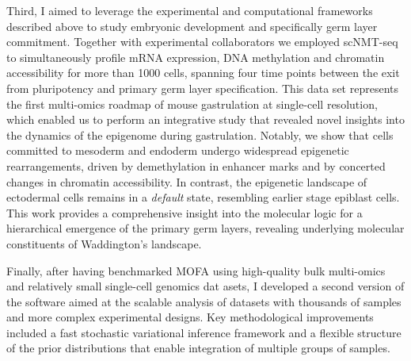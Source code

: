 Third, I aimed to leverage the experimental and computational frameworks described above to study embryonic development and specifically germ layer commitment. Together with experimental collaborators we employed scNMT-seq to simultaneously profile mRNA expression, DNA methylation and chromatin accessibility for more than 1000 cells, spanning four time points between the exit from pluripotency and primary germ layer specification. This data set represents the first multi-omics roadmap of mouse gastrulation at single-cell resolution, which enabled us to perform an integrative study that revealed novel insights into the dynamics of the epigenome during gastrulation. Notably, we show that cells committed to mesoderm and endoderm undergo widespread epigenetic rearrangements, driven by demethylation in enhancer marks and by concerted changes in chromatin accessibility. In contrast, the epigenetic landscape of ectodermal cells remains in a \textit{default} state, resembling earlier stage epiblast cells. This work provides a comprehensive insight into the molecular logic for a hierarchical emergence of the primary germ layers, revealing underlying molecular constituents of Waddington's landscape.

Finally, after having benchmarked MOFA using high-quality bulk multi-omics and relatively small single-cell genomics dat asets, I developed a second version of the software aimed at the scalable analysis of datasets with thousands of samples and more complex experimental designs. Key methodological improvements included a fast stochastic variational inference framework and a flexible structure of the prior distributions that enable integration of multiple groups of samples. 
